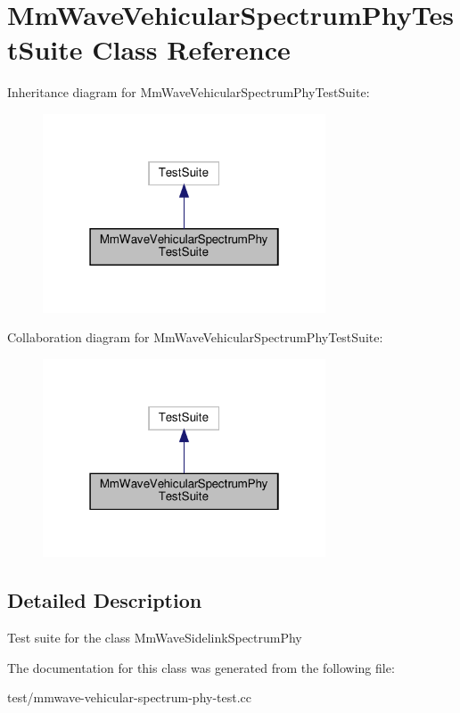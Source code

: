 \hypertarget{classMmWaveVehicularSpectrumPhyTestSuite}{}\section{Mm\+Wave\+Vehicular\+Spectrum\+Phy\+Test\+Suite Class Reference}
\label{classMmWaveVehicularSpectrumPhyTestSuite}


Inheritance diagram for Mm\+Wave\+Vehicular\+Spectrum\+Phy\+Test\+Suite\+:\nopagebreak
\begin{figure}[H]
\begin{center}
\leavevmode
\includegraphics[width=238pt]{classMmWaveVehicularSpectrumPhyTestSuite__inherit__graph}
\end{center}
\end{figure}


Collaboration diagram for Mm\+Wave\+Vehicular\+Spectrum\+Phy\+Test\+Suite\+:\nopagebreak
\begin{figure}[H]
\begin{center}
\leavevmode
\includegraphics[width=238pt]{classMmWaveVehicularSpectrumPhyTestSuite__coll__graph}
\end{center}
\end{figure}


\subsection{Detailed Description}
Test suite for the class Mm\+Wave\+Sidelink\+Spectrum\+Phy 

The documentation for this class was generated from the following file\+:\begin{DoxyCompactItemize}
\item 
test/mmwave-\/vehicular-\/spectrum-\/phy-\/test.\+cc\end{DoxyCompactItemize}
